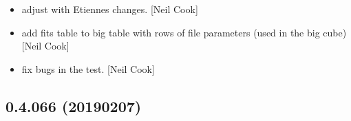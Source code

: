 \documentclass[a4paper,10pt,english]{report}
\begin{document}
\begin{itemize}
\item {} 
 \sphinxhyphen{} adjust with Etiennes changes. {[}Neil Cook{]}

\item {} 
 \sphinxhyphen{} add fits table to big table with rows of file
parameters (used in the big cube) {[}Neil Cook{]}

\item {} 
 \sphinxhyphen{} fix bugs in the test. {[}Neil Cook{]}

\end{itemize}


\subsection{0.4.066 (2019\sphinxhyphen{}02\sphinxhyphen{}07)}
\end{document}
